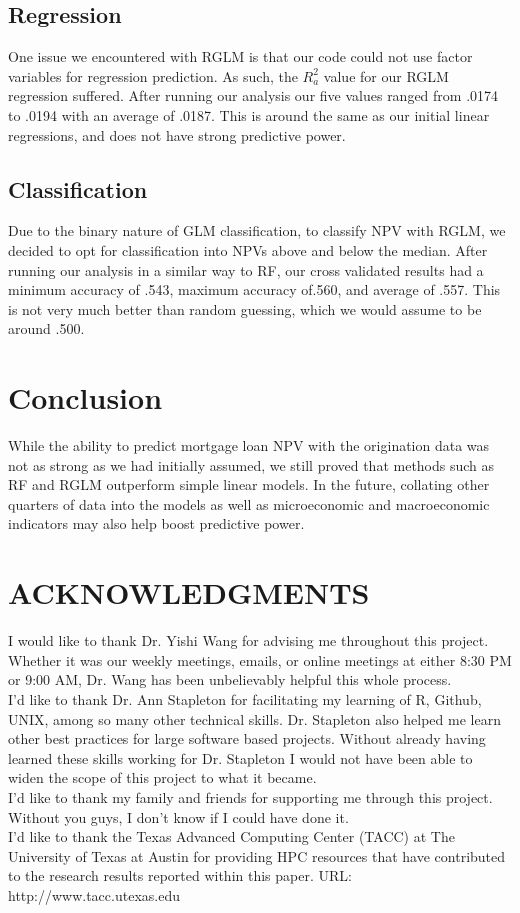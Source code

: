 \documentclass[12 pt]{uncw_thesis}
\theoremstyle{plain}
\theoremstyle{remark}
\theoremstyle{definition}
\begin{document}
\subsection{Regression}
One issue we encountered with RGLM is that our code could not use factor variables for regression prediction. As such, the \(R_a^2\) value for our RGLM regression suffered. After running our analysis our five values ranged from .0174 to .0194 with an average of .0187. This is around the same as our initial linear regressions, and does not have strong predictive power.
\subsection{Classification}
Due to the binary nature of GLM classification, to classify NPV with RGLM, we decided to opt for classification into NPVs above and below the median. After running our analysis in a similar way to RF, our cross validated results had a minimum accuracy of .543, maximum accuracy of.560, and average of .557. This is not very much better than random guessing, which we would assume to be around .500. 
\section{Conclusion}
While the ability to predict mortgage loan NPV with the origination data was not as strong as we had initially assumed, we still proved that methods such as RF and RGLM outperform simple linear models. In the future, collating other quarters of data into the models as well as microeconomic and macroeconomic indicators may also help boost predictive power. 

\newpage
\section*{ACKNOWLEDGMENTS}
I would like to thank Dr. Yishi Wang for advising me throughout this project. Whether it was our weekly meetings, emails, or online meetings at either 8:30 PM or 9:00 AM, Dr. Wang has been unbelievably helpful this whole process. \\
\linebreak
I'd like to thank Dr. Ann  Stapleton for facilitating my learning of R,  Github, UNIX, among so many other technical skills. Dr. Stapleton also helped me learn other best practices for large software based projects. Without already having learned these skills working for Dr. Stapleton I would not have been able to widen the scope of this project to what it became.\\
\linebreak 
I'd like to thank my family and friends for supporting me through this project. Without you guys, I don't know if I could have done it.\\
\linebreak
I'd like to thank the Texas Advanced Computing Center (TACC) at The University of Texas at Austin for providing HPC resources that have contributed to the research results reported within this paper. URL: http://www.tacc.utexas.edu
%
\end{document}
